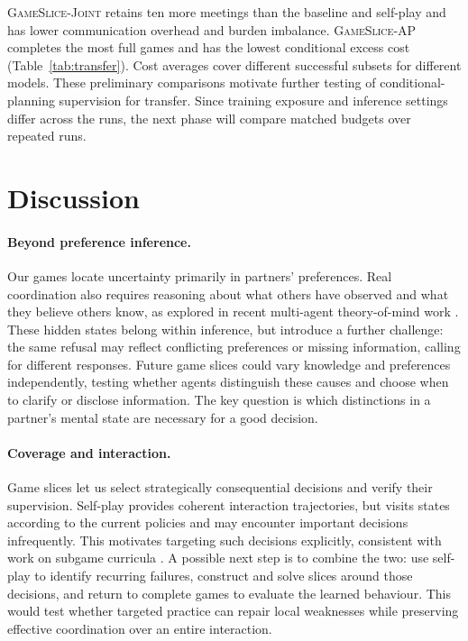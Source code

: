 \documentclass[11pt,a4paper]{article}
\begin{document}
\textsc{GameSlice-Joint} retains ten more meetings than the baseline and
self-play and has lower communication overhead and burden imbalance.
\textsc{GameSlice-AP} completes the most full games and has the lowest
conditional excess cost (Table~\ref{tab:transfer}). Cost averages cover
different successful subsets for different models. These preliminary
comparisons motivate further testing of conditional-planning supervision
for transfer. Since training exposure and inference settings differ across
the runs, the next phase will compare matched budgets over repeated runs.

\section{Discussion}
\label{sec:discussion}
\paragraph{Beyond preference inference.}
Our games locate uncertainty primarily in partners' preferences. Real
coordination also requires reasoning about what others have observed and
what they believe others know, as explored in recent multi-agent theory-of-mind
work \citep{ys2026sotopiatom,mu2026adaptive,cross2025hypothetical}. These hidden
states belong within inference, but introduce a further challenge: the same
refusal may reflect conflicting preferences or missing information, calling
for different responses. Future game slices could vary knowledge and
preferences independently, testing whether agents distinguish these causes
and choose when to clarify or disclose information. The
key question is which distinctions in a partner's mental state are necessary
for a good decision.

\paragraph{Coverage and interaction.}
Game slices let us select strategically consequential decisions and verify
their supervision. Self-play provides coherent interaction trajectories, but
visits states according to the current policies and may encounter important
decisions infrequently. This motivates targeting such decisions explicitly,
consistent with work on subgame curricula \citep{chen2024subgame}. A possible next step is to combine
the two: use self-play to identify recurring failures, construct and solve
slices around those decisions, and return to complete games to evaluate the
learned behaviour. This would test whether targeted practice can repair local
weaknesses while preserving effective coordination over an entire interaction.
\end{document}
